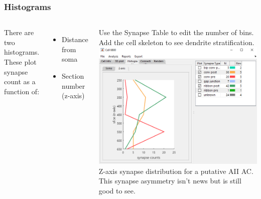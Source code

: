 \documentclass[11pt]{beamer}
\begin{document}
\begin{frame}
	\frametitle{Histograms}
	\begin{columns}
			There are two histograms. These plot synapse count as a function of:
			\begin{itemize}
				\item Distance from soma
				\item Section number (z-axis)
			\end{itemize}
		Use the Synapse Table to edit the number of bins. Add the cell skeleton to see dendrite stratification.
			\includegraphics[width=\textwidth]{c6800_histZ}
		\vskip3pt
		Z-axis synapse distribution for a putative AII AC. This synapse asymmetry isn't news but is still good to see.
	\end{columns}
\end{frame}
\end{document}
